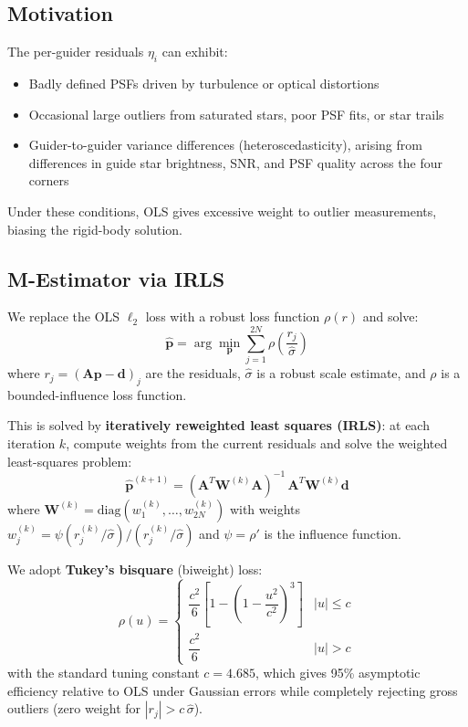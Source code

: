 \documentclass[SE,lsstdraft,authoryear,toc]{lsstdoc}
\begin{document}
\subsection{Motivation}

The per-guider residuals $\eta_i$ can exhibit:
\begin{itemize}
\item Badly defined PSFs driven by turbulence or optical distortions
\item Occasional large outliers from saturated stars, poor PSF fits,
  or star trails
\item Guider-to-guider variance differences (heteroscedasticity),
  arising from differences in guide star brightness, SNR, and PSF
  quality across the four corners
\end{itemize}
Under these conditions, OLS gives excessive weight to outlier
measurements, biasing the rigid-body solution.

\subsection{M-Estimator via IRLS}

We replace the OLS $\ell_2$ loss with a robust loss function
$\rho(r)$ and solve:
\begin{equation}
\hat{\mathbf{p}} = \arg\min_{\mathbf{p}}
\sum_{j=1}^{2N} \rho\!\left(\frac{r_j}{\hat{\sigma}}\right)
\label{eq:mestimator}
\end{equation}
where $r_j = (\mathbf{A}\mathbf{p} - \mathbf{d})_j$ are the
residuals, $\hat{\sigma}$ is a robust scale estimate, and $\rho$ is a
bounded-influence loss function.

This is solved by \textbf{iteratively reweighted least squares (IRLS)}:
at each iteration $k$, compute weights from the current residuals and
solve the weighted least-squares problem:
\begin{equation}
\hat{\mathbf{p}}^{(k+1)}
= (\mathbf{A}^T \mathbf{W}^{(k)} \mathbf{A})^{-1}\,
  \mathbf{A}^T \mathbf{W}^{(k)} \mathbf{d}
\label{eq:irls}
\end{equation}
where $\mathbf{W}^{(k)} = \mathrm{diag}(w_1^{(k)}, \ldots,
w_{2N}^{(k)})$ with weights $w_j^{(k)} = \psi(r_j^{(k)} /
\hat{\sigma}) / (r_j^{(k)} / \hat{\sigma})$ and
$\psi = \rho'$ is the influence function.

We adopt \textbf{Tukey's bisquare} (biweight) loss:
\begin{equation}
\rho(u) =
\begin{cases}
\dfrac{c^2}{6}\left[1 - \left(1 - \dfrac{u^2}{c^2}\right)^{\!3}\right]
  & |u| \leq c \\[6pt]
\dfrac{c^2}{6} & |u| > c
\end{cases}
\label{eq:tukey}
\end{equation}
with the standard tuning constant $c = 4.685$, which gives 95\%
asymptotic efficiency relative to OLS under Gaussian errors while
completely rejecting gross outliers (zero weight for
$|r_j| > c\,\hat{\sigma}$).
\end{document}
